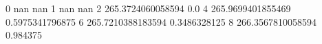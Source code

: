0 nan nan
1 nan nan
2 265.3724060058594 0.0
4 265.9699401855469 0.5975341796875
6 265.7210388183594 0.3486328125
8 266.3567810058594 0.984375
